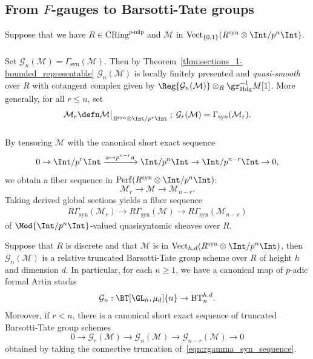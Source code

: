 \documentclass[10pt]{amsart}
\begin{document}
\subsection{From $F$-gauges to Barsotti-Tate groups}
\label{subsec:G_functor}

Suppose that we have $R\in \mathrm{CRing}^{p\text{-nilp}}$ and $\mathcal{M}$ in $\mathrm{Vect}_{\{0,1\}}(R^{\mathrm{syn}}\otimes\Int/p^n\Int)$. 

\subsubsection{}
Set $\mathcal{G}_n(\mathcal{M}) = \Gamma_{\mathrm{syn}}(\mathcal{M})$. Then by Theorem~\ref{thm:sections_1-bounded_representable} $\mathcal{G}_n(\mathcal{M})$ is locally finitely presented and \emph{quasi-smooth} over $R$ with cotangent complex given by $\Reg{\mathcal{G}_n(\mathcal{M})}\otimes_R\gr^{-1}_{\mathrm{Hdg}}M[1]$. More generally, for all $r\leq n$, set
\[
\mathcal{M}_r \defn \mathcal{M}\bigr\vert_{R^{\mathrm{syn}}\otimes\Int/p^{r}\Int}\;;\;\mathcal{G}_r(\mathcal{M}) = \Gamma_{\mathrm{syn}}(\mathcal{M}_r).
\]

\subsubsection{}
By tensoring $\mathcal{M}$ with the canonical short exact sequence
\[
0\to \Int/p^r\Int\xrightarrow{a\mapsto p^{n-r}a}\Int/p^n\Int\to \Int/p^{n-r}\Int\to 0,
\]
we obtain a fiber sequence in $\mathrm{Perf}(R^{\mathrm{syn}}\otimes\Int/p^n\Int)$: 
\[
\mathcal{M}_{r}\to \mathcal{M}\to \mathcal{M}_{n-r}.
\]
Taking derived global sections yields a fiber sequence
\begin{align}\label{eqn:rgamma_syn_sequence}
R\Gamma_{\mathrm{syn}}(\mathcal{M}_r)\to R\Gamma_{\mathrm{syn}}(\mathcal{M})\to R\Gamma_{\mathrm{syn}}(\mathcal{M}_{n-r})
\end{align}
of $\Mod{\Int/p^n\Int}$-valued quasisyntomic sheaves over $R$. 


\begin{theorem}
\label{thm:g_functor}
Suppose that $R$ is discrete and that $\mathcal{M}$ is in $\mathrm{Vect}_{h,d}(R^{\mathrm{syn}}\otimes\Int/p^n\Int)$, then $\mathcal{G}_n(\mathcal{M})$ is a relative truncated Barsotti-Tate group scheme over $R$ of height $h$ and dimension $d$. In particular, for each $n\ge 1$, we have a canonical map of $p$-adic formal Artin stacks
\[
\mathcal{G}_n:\BT[\GL_h,\mu_d]{n}\to \mathrm{BT}^{h,d}_n.
\]
Moreover, if $r<n$, there is a canonical short exact sequence of truncated Barsotti-Tate group schemes
\[
0\to \mathcal{G}_{r}(\mathcal{M})\to \mathcal{G}_n(\mathcal{M})\to \mathcal{G}_{n-r}(\mathcal{M})\to 0
\]
obtained by taking the connective truncation of~\eqref{eqn:rgamma_syn_sequence}.
\end{theorem}   
\end{document}
